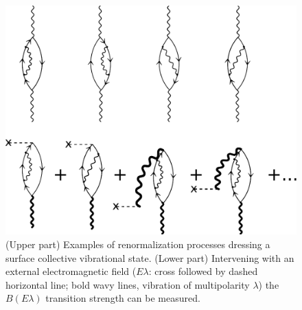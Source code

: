 \documentclass[a4paper,11pt]{book}
\numberwithin{equation}{section}
\numberwithin{figure}{section}
\numberwithin{table}{section}
\begin{document}
\begin{figure}
\centerline {
\includegraphics*[width=12cm]{introduccion/figs/figpreface9}
}
\caption{(Upper part) Examples of renormalization processes dressing a surface collective vibrational state. (Lower part) Intervening with an external electromagnetic field ($E\lambda$: cross followed by dashed horizontal line; bold wavy lines, vibration of multipolarity $\lambda$) the $B(E\lambda)$ transition strength can be measured.}
\label{fig1.0.9}
\end{figure}










\end{document}
